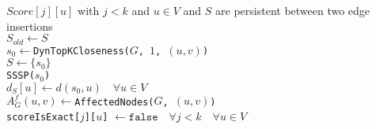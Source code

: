 \begin{algorithm2e}[h!]
  \label{alg:dynamicGroupCloseness}
  $Score[j][u] $ with $j < k$ and $u \in V$ and $S$ are persistent between two edge insertions \\
  $S_{old} \gets S$ \label{alg:dynamicGcBackup} \\
  $s_0 \gets $\texttt{DynTopKCloseness($G$, $1$, $(u, v)$)} \label{alg:dynamicGcTopKCloseness} \\
  $S \gets \{s_0\}$ \\
  \texttt{SSSP($s_0$)} \\
  $d_S[u] \gets d(s_0, u) \quad \forall u \in V$ \\
  $A_G^f(u, v) \gets $\texttt{AffectedNodes($G$, $(u, v)$)} \label{alg:dynamicGcAffectedNodes} \\
  \texttt{scoreIsExact[$j$][$u$]} $\gets \texttt{false} \quad \forall j < k \quad \forall u \in V$ \label{alg:dynamicGcUpperBound1} \\
  
\end{algorithm2e}

